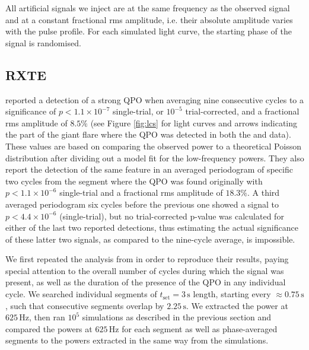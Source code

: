 \documentclass{emulateapj}
\begin{document}
All artificial signals we inject are at the same frequency as the observed signal and at a constant fractional rms amplitude, i.e. their absolute amplitude varies with the pulse profile. For each simulated light curve, the starting phase of the signal is randomised. 




\subsection{RXTE}
\label{sec:rxte_results}


\citealt{Strohmayer06} reported a detection of a strong QPO when averaging nine consecutive cycles to a significance of $p < 1.1 \times 10^{-7}$ single-trial, or $10^{-5}$ trial-corrected, and a fractional rms amplitude of $8.5\%$ (see Figure \ref{fig:lcs} for light curves and arrows indicating the part of the giant flare where the QPO was detected in both the \rxte and \rhessi data). These values are based on comparing the observed power to a theoretical Poisson distribution after dividing out a model fit for the low-frequency powers. They also report the detection of the same feature in an averaged periodogram of specific two cycles from the segment where the QPO was found originally with $p < 1.1 \times 10^{-6}$ single-trial and a fractional rms amplitude of $18.3\%$. A third averaged periodogram six cycles before the previous one showed a signal to $p < 4.4 \times 10^{-6}$ (single-trial), but no trial-corrected p-value was calculated for either of the last two reported detections, thus estimating the actual significance of these latter two signals, as compared to the nine-cycle average, is impossible.

We first repeated the analysis from \citealt{Strohmayer06} in order to reproduce their results, paying special attention to the overall number of cycles during which the signal was present, as well as the duration of the presence of the QPO in any individual cycle.
We searched individual segments of $t_{\mathrm{set}} = 3 \, \mathrm{s}$ length, starting every $\approx 0.75 \, \mathrm{s}$, such that consecutive segments overlap by $2.25 \, \mathrm{s}$. We extracted the power at $625 \, \mathrm{Hz}$, then ran $10^5$ simulations as described in the previous section and compared the powers at $625 \, \mathrm{Hz}$ for each segment as well as phase-averaged segments to the powers extracted in the same way from the simulations.
\end{document}
